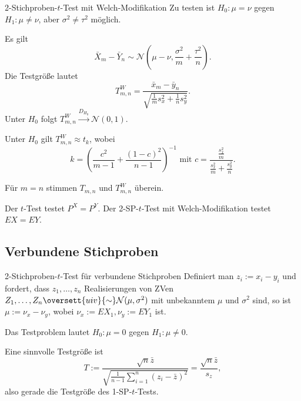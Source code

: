\begin{karte}{2-Stichproben-\(t\)-Test mit Welch-Modifikation}
Zu testen ist \(H_0: \mu = \nu\) gegen \(H_1: \mu \neq \nu\), aber \(\sigma^2 \neq \tau^2\) möglich.

Es gilt 
\[ \bar{X}_m - \bar{Y}_n \sim \mathcal{N}(\mu - \nu, \frac{\sigma^2}{m} + \frac{\tau^2}{n}). \]
Die Testgröße lautet 
\[ T_{m,n}^W = \frac{\bar{x}_m - \bar{y}_n}{ \sqrt{ \frac{1}{m} s_x^2 + \frac{1}{n} s_y^2 } }. \]
Unter \(H_0\) folgt \( T_{m,n}^W \overset{D_{H_0}}{\longrightarrow} \mathcal{N}(0,1) \).

Unter \(H_0\) gilt \(T_{m,n}^W \approx t_k\), wobei 
\[ k = \left( \frac{c^2}{m-1} + \frac{(1-c)^2}{n-1} \right)^{-1} \text{ mit } c = \frac{\frac{s_x^2}{m}}{\frac{s_x^2}{m} + \frac{s_y^2}{n}}. \]

Für \(m=n\) stimmen \(T_{m,n}\) und \(T_{m,n}^W\) überein. 

Der \(t\)-Test testet \(P^X = P^Y\). Der 2-SP-\(t\)-Test mit Welch-Modifikation testet \(EX = EY\).
\end{karte}

\subsection{Verbundene Stichproben}

\begin{karte}{2-Stichproben-\(t\)-Test für verbundene Stichproben}
Definiert man \(z_i := x_i - y_i\) und fordert, dass \(z_1, \ldots, z_n\) 
Realisierungen von ZVen \(Z_1, \ldots, Z_n \oversett{uiv}{\sim} \mathcal{N}(\mu, \sigma^2)\) mit unbekanntem \(\mu\) 
und \(\sigma^2\) sind, so ist \(\mu := \nu_x - \nu_y\), wobei \(\nu_x := EX_1, \nu_y := EY_1\) ist.

Das Testproblem lautet \(H_0: \mu = 0\) gegen \(H_1: \mu \neq 0\).

Eine sinnvolle Testgröße ist 
\[ T := \frac{\sqrt{n} \bar{z}}{\sqrt{ \frac{1}{n-1} \sum_{i=1}^n (z_i - \bar{z})^2 }} = \frac{\sqrt{n} \bar{z}}{s_z}, \]
also gerade die Testgröße des 1-SP-\(t\)-Tests.
\end{karte}